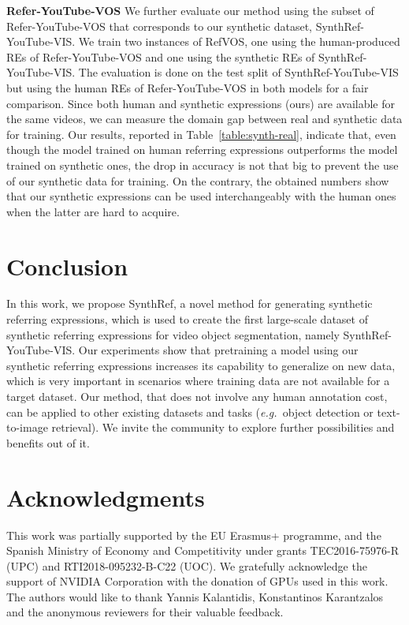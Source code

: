 \documentclass[11pt]{article}
\newcommand{\eg}{\textit{e.g.~}}
\begin{document}
\noindent
\textbf{Refer-YouTube-VOS}
\quad We further evaluate our method using the subset of Refer-YouTube-VOS that corresponds to our synthetic dataset, SynthRef-YouTube-VIS. We train two instances of RefVOS, one using the 
human-produced REs of Refer-YouTube-VOS and one using the synthetic REs of SynthRef-YouTube-VIS. The evaluation is done on the test split of SynthRef-YouTube-VIS but using the human REs of Refer-YouTube-VOS in both models for a fair comparison. Since both human and synthetic expressions (ours) are available for the same videos, we can measure the domain gap between real and synthetic data for training. Our results, reported in Table~\ref{table:synth-real}, indicate that, even though the model trained on human referring expressions outperforms the model trained on synthetic ones, the drop in accuracy is not that big to prevent the use of our synthetic data for training. On the contrary, the obtained numbers show that our synthetic expressions can be used interchangeably with the human ones when the latter are hard to acquire.





%
 \section{Conclusion}
\label{sec:conclusion}

In this work, we propose SynthRef, a novel method for generating synthetic referring expressions, which is used to create the first large-scale dataset of synthetic referring expressions for video object segmentation, namely SynthRef-YouTube-VIS. 
Our experiments show that pretraining a model using our synthetic referring expressions increases its capability to generalize on new data, which is very important in scenarios where training data are not available for a target dataset. Our method, that does not involve any human annotation cost, can be applied to other existing datasets and tasks (\eg object detection or text-to-image retrieval). 
We invite the community to explore further possibilities and benefits out of it. \\
\section*{Acknowledgments}
\small{This work was partially supported by the EU Erasmus+ programme, and the Spanish Ministry of Economy and Competitivity under grants TEC2016-75976-R (UPC) and RTI2018-095232-B-C22 (UOC).
We gratefully acknowledge the support of NVIDIA Corporation with the donation of GPUs used in this work.
The authors would like to thank Yannis Kalantidis, Konstantinos Karantzalos and the anonymous reviewers for their valuable feedback.
} 


\end{document}

